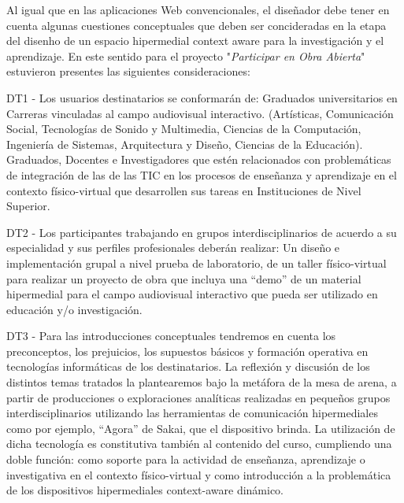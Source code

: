\documentclass{llncs}
\begin{document}
Al igual que en las aplicaciones Web convencionales, el diseñador debe tener en cuenta algunas cuestiones conceptuales que deben ser concideradas en la etapa del disenho de un espacio hipermedial context aware para la investigación y el aprendizaje. En este sentido para el proyecto "\textit{Participar en Obra Abierta}" \cite{libro7} estuvieron presentes las siguientes consideraciones:

\begin{description}


\item DT1 - Los usuarios destinatarios se conformarán de: Graduados universitarios en Carreras vinculadas al campo audiovisual interactivo. (Artísticas, Comunicación Social, Tecnologías de Sonido y Multimedia, Ciencias de la Computación, Ingeniería de Sistemas, Arquitectura y Diseño, Ciencias de la Educación). Graduados, Docentes e Investigadores que estén relacionados con problemáticas de integración de las de las TIC en los procesos de enseñanza y aprendizaje en el contexto físico-virtual que desarrollen sus tareas en Instituciones de Nivel Superior.

\bigskip

\item  DT2 - Los participantes trabajando en grupos interdisciplinarios de acuerdo a su especialidad y sus perfiles profesionales deberán realizar:
Un diseño e implementación grupal a nivel prueba de laboratorio, de un taller físico-virtual para realizar un proyecto de obra que incluya una “demo” de un material hipermedial para el campo audiovisual interactivo que pueda ser utilizado en educación y/o investigación.

\bigskip

\item  DT3 - Para las introducciones conceptuales tendremos en cuenta los preconceptos, los prejuicios, los supuestos básicos y formación operativa en tecnologías informáticas de los destinatarios.  La reflexión y discusión de los distintos temas tratados la plantearemos bajo la metáfora de la mesa de arena, a partir de producciones o exploraciones analíticas realizadas en pequeños grupos interdisciplinarios utilizando las herramientas de comunicación hipermediales como por ejemplo, “Agora” de Sakai, que el dispositivo brinda. La utilización de dicha tecnología es constitutiva también al contenido del curso, cumpliendo una doble función: como soporte para la actividad de enseñanza, aprendizaje o investigativa en el contexto físico-virtual y como introducción a la problemática de los dispositivos hipermediales context-aware dinámico.


\end{description}
\end{document}
